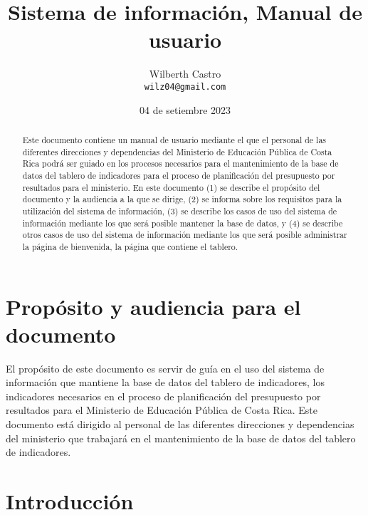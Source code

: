 \documentclass[a4paper, 9pt, conference]{article}              %
\begin{document}
\title{Sistema de informaci\'on, Manual de usuario}

\author{
	Wilberth Castro \\
	\small{\texttt{wilz04@gmail.com}}
}

\date{\small{04 de setiembre 2023}}

\maketitle


\begin{abstract}
	Este documento contiene un manual de usuario mediante el que el personal de las diferentes direcciones y dependencias del Ministerio de Educaci\'on P\'ublica de Costa Rica podr\'a ser guiado en los procesos necesarios para el mantenimiento de la base de datos del tablero de indicadores para el proceso de planificaci\'on del presupuesto por resultados para el ministerio. En este documento (1) se describe el prop\'osito del documento y la audiencia a la que se dirige, (2) se informa sobre los requisitos para la utilizaci\'on del sistema de informaci\'on, (3) se describe los casos de uso del sistema de informaci\'on mediante los que ser\'a posible mantener la base de datos, y (4) se describe otros casos de uso del sistema de informaci\'on mediante los que ser\'a posible administrar la p\'agina de bienvenida, la p\'agina que contiene el tablero.
\end{abstract}

\section{Prop\'osito y audiencia para el documento} \label{sec:goal}

El prop\'osito de este documento es servir de gu\'ia en el uso del sistema de informaci\'on que mantiene la base de datos del tablero de indicadores, los indicadores necesarios en el proceso de planificaci\'on del presupuesto por resultados para el Ministerio de Educaci\'on P\'ublica de Costa Rica. Este documento est\'a dirigido al personal de las diferentes direcciones y dependencias del ministerio que trabajar\'a en el mantenimiento de la base de datos del tablero de indicadores.

\section{Introducci\'on} \label{sec:intro}
\end{document}
